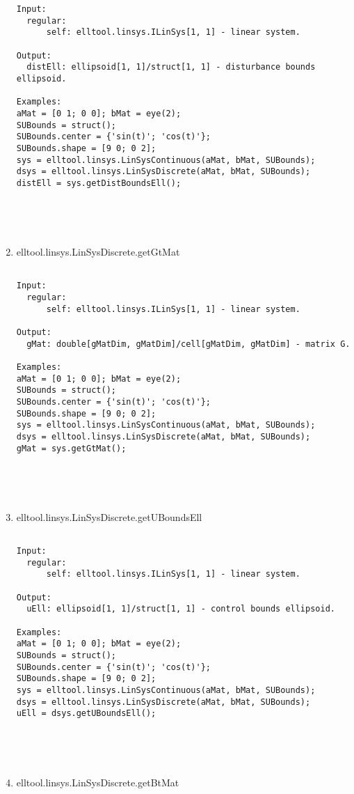 \begin{enumerate}
\begin{lstlisting}
Input:
  regular:
      self: elltool.linsys.ILinSys[1, 1] - linear system.

Output:
  distEll: ellipsoid[1, 1]/struct[1, 1] - disturbance bounds ellipsoid.

Examples:
aMat = [0 1; 0 0]; bMat = eye(2);
SUBounds = struct();
SUBounds.center = {'sin(t)'; 'cos(t)'};
SUBounds.shape = [9 0; 0 2];
sys = elltool.linsys.LinSysContinuous(aMat, bMat, SUBounds);
dsys = elltool.linsys.LinSysDiscrete(aMat, bMat, SUBounds);
distEll = sys.getDistBoundsEll();





\end{lstlisting}
\fontfamily{\familydefault}
\selectfont
\item {elltool.linsys.LinSysDiscrete.getGtMat}
\selectfont
\begin{lstlisting}

Input:
  regular:
      self: elltool.linsys.ILinSys[1, 1] - linear system.

Output:
  gMat: double[gMatDim, gMatDim]/cell[gMatDim, gMatDim] - matrix G.

Examples:
aMat = [0 1; 0 0]; bMat = eye(2);
SUBounds = struct();
SUBounds.center = {'sin(t)'; 'cos(t)'};
SUBounds.shape = [9 0; 0 2];
sys = elltool.linsys.LinSysContinuous(aMat, bMat, SUBounds);
dsys = elltool.linsys.LinSysDiscrete(aMat, bMat, SUBounds);
gMat = sys.getGtMat();





\end{lstlisting}
\fontfamily{\familydefault}
\selectfont
\item {elltool.linsys.LinSysDiscrete.getUBoundsEll}
\selectfont
\begin{lstlisting}

Input:
  regular:
      self: elltool.linsys.ILinSys[1, 1] - linear system.

Output:
  uEll: ellipsoid[1, 1]/struct[1, 1] - control bounds ellipsoid.

Examples:
aMat = [0 1; 0 0]; bMat = eye(2);
SUBounds = struct();
SUBounds.center = {'sin(t)'; 'cos(t)'};
SUBounds.shape = [9 0; 0 2];
sys = elltool.linsys.LinSysContinuous(aMat, bMat, SUBounds);
dsys = elltool.linsys.LinSysDiscrete(aMat, bMat, SUBounds);
uEll = dsys.getUBoundsEll();





\end{lstlisting}
\fontfamily{\familydefault}
\selectfont
\item {elltool.linsys.LinSysDiscrete.getBtMat}
\selectfont
\begin{lstlisting}


\end{lstlisting}
\end{enumerate}

